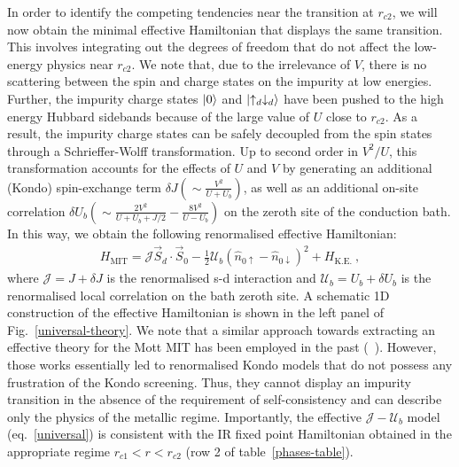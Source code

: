 In order to identify the competing tendencies near the transition at \(r_{c2}\), we will now obtain the minimal effective Hamiltonian that displays the same transition. This involves integrating out the degrees of freedom that do not affect the low-energy physics near \(r_{c2}\).
We note that, due to the irrelevance of \(V\), there is no scattering between the spin and charge states on the impurity at low energies.
Further, the impurity charge states \(\ket{0}\) and \(\ket{\uparrow_d \downarrow_d}\) have been pushed to the high energy Hubbard sidebands because of the large value of \(U\) close to \(r_{c2}\).
As a result, the impurity charge states can be safely decoupled from the spin states through a Schrieffer-Wolff transformation. Up to second order in $V^{2}/U$, this transformation accounts for the effects of \(U\) and \(V\) by generating an additional (Kondo) spin-exchange term \(\delta J \left(\sim \frac{V^2}{U+U_b}\right)\), as well as an additional on-site correlation \(\delta U_b\left(\sim \frac{2V^2}{U+U_b+J/2} - \frac{8V^{2}}{U-U_{b}}\right)\) on the zeroth site of the conduction bath. In this way, we obtain the following renormalised effective Hamiltonian:
\begin{eqnarray}
	\label{universal}
	H_\text{MIT} = \mathcal{J} \vec{S}_d\cdot\vec{S}_0 - \frac{1}{2}\mathcal{U}_b\left(\hat n_{0 \uparrow} - \hat n_{0 \downarrow}\right)^2 + H_\text{K.E.}~,
\end{eqnarray}
where \(\mathcal{J} = J + \delta J\) is the renormalised s-d interaction and \(\mathcal{U}_b = U_b + \delta U_b\) is the renormalised local correlation on the bath zeroth site.
A schematic 1D construction of the effective Hamiltonian is shown in the left panel of Fig.~\eqref{universal-theory}.
We note that a similar approach towards extracting an effective theory for the Mott MIT has been employed in the past (~\cite{moeller_1995,held_2013}). However, those works essentially led to renormalised Kondo models that do not possess any frustration of the Kondo screening. Thus, they cannot display an impurity transition in the absence of the requirement of self-consistency and can describe only the physics of the metallic regime. Importantly, the effective \(\mathcal{J}-\mathcal{U}_b\) model (eq.~\eqref{universal}) is consistent with the IR fixed point Hamiltonian obtained in the appropriate regime \(r_{c1} < r < r_{c2}\) (row 2 of table~\eqref{phases-table}).

